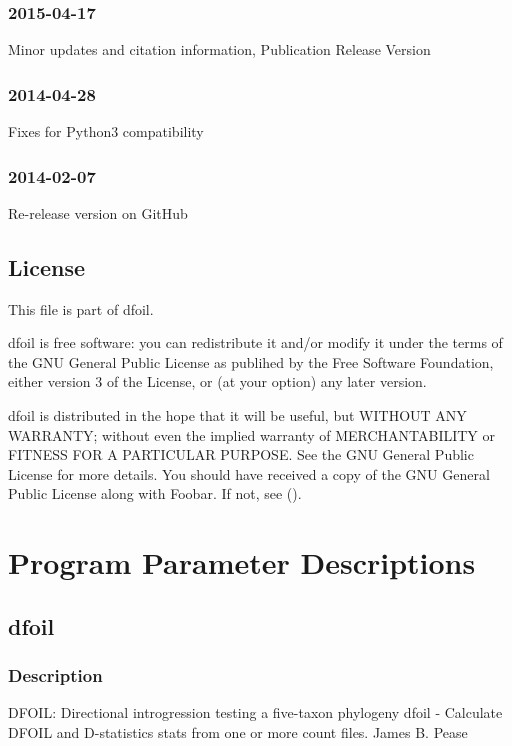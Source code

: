 \documentclass[letterpaper,12pt,english]{sphinxmanual}
\begin{document}
\subsection{2015-04-17}
\label{\detokenize{intro:id4}}
Minor updates and citation information, Publication Release Version


\subsection{2014-04-28}
\label{\detokenize{intro:id5}}
Fixes for Python3 compatibility


\subsection{2014-02-07}
\label{\detokenize{intro:id6}}
Re-release version on GitHub


\section{License}
\label{\detokenize{intro:license}}
This file is part of dfoil.

dfoil is free software: you can redistribute it and/or modify it under the terms of the GNU General Public License as publihed by the Free Software Foundation, either version 3 of the License, or (at your option) any later version.

dfoil is distributed in the hope that it will be useful, but WITHOUT ANY WARRANTY; without even the implied warranty of MERCHANTABILITY or FITNESS FOR A PARTICULAR PURPOSE.  See the GNU General Public License for more details. You should have received a copy of the GNU General Public License along with Foobar.  If not, see ().


\chapter{Program Parameter Descriptions}
\label{\detokenize{prog_desc:program-parameter-descriptions}}\label{\detokenize{prog_desc::doc}}

\section{dfoil}
\label{\detokenize{prog_desc:dfoil}}

\subsection{Description}
\label{\detokenize{prog_desc:description}}
DFOIL: Directional introgression testing a five-taxon phylogeny
dfoil - Calculate DFOIL and D-statistics stats from one or more count files.
James B. Pease
\end{document}
